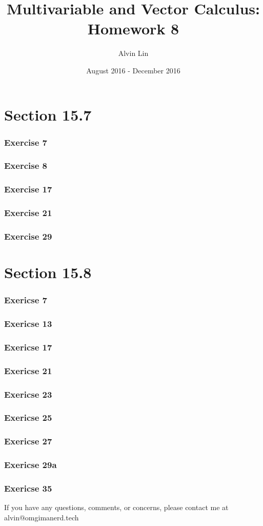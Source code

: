 \documentclass{math}
\title{Multivariable and Vector Calculus: Homework 8}
\author{Alvin Lin}
\date{August 2016 - December 2016}
\begin{document}
\maketitle

\section*{Section 15.7}

\subsubsection*{Exercise 7}
\subsubsection*{Exercise 8}
\subsubsection*{Exercise 17}
\subsubsection*{Exercise 21}
\subsubsection*{Exercise 29}

\section*{Section 15.8}

\subsubsection*{Exericse 7}
\subsubsection*{Exericse 13}
\subsubsection*{Exericse 17}
\subsubsection*{Exericse 21}
\subsubsection*{Exericse 23}
\subsubsection*{Exericse 25}
\subsubsection*{Exericse 27}
\subsubsection*{Exericse 29a}
\subsubsection*{Exericse 35​}

\begin{center}
  If you have any questions, comments, or concerns, please contact me at
  alvin@omgimanerd.tech
\end{center}
\end{document}
